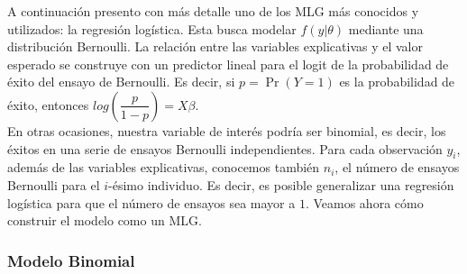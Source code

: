 A continuación presento con más detalle uno de los MLG más conocidos y utilizados: la regresión logística. Esta busca modelar $f(y|\theta)$ mediante una distribución Bernoulli. La relación entre las variables explicativas y el valor esperado se construye con un predictor lineal para el logit de la probabilidad de éxito del ensayo de Bernoulli. Es decir, si $p = \Pr(Y=1)$ es la probabilidad de éxito, entonces $log\left(\dfrac{p}{1-p}\right)=X\beta$.\\ 

En otras ocasiones, nuestra variable de interés podría ser binomial, es decir, los éxitos en una serie de ensayos Bernoulli independientes. Para cada observación $y_i$, además de las variables explicativas, conocemos también $n_i$, el número de ensayos Bernoulli para el $i$-ésimo individuo. Es decir, es posible generalizar una regresión logística para que el número de ensayos sea mayor a $1$. Veamos ahora cómo construir el modelo como un MLG.

\subsubsection*{Modelo Binomial}

